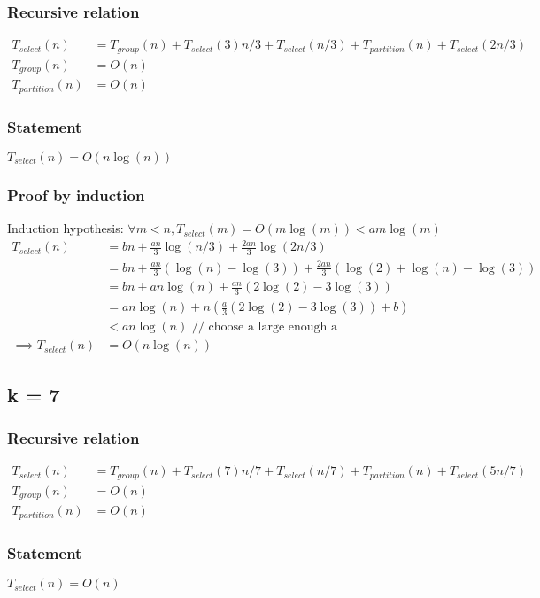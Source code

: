 \documentclass{article}
\begin{document}
\subsubsection{Recursive relation}
\begin{align*}
T_{select}(n) &= T_{group}(n) + T_{select}(3)n/3 + T_{select}(n/3)
+T_{partition}(n) + T_{select}(2n/3)\\
T_{group}(n) &= O(n)\\
T_{partition}(n) &= O(n)
\end{align*}
\subsubsection{Statement}
$T_{select}(n) = O(n \log (n))$
\subsubsection{Proof by induction}
Induction hypothesis: $\forall m < n, T_{select}(m) = O(m\log(m)) < am\log(m)$
\begin{align*}
T_{select}(n)
&= bn + \frac{an}{3}\log(n/3) + \frac{2an}{3}\log(2n/3)\\
&= bn + \frac{an}{3}(\log(n) - \log(3)) + \frac{2an}{3}(\log(2)+\log(n)-\log(3))\\
&= bn + an \log(n) + \frac{an}{3}(2\log(2)-3\log(3))\\
&= an \log(n) + n(\frac{a}{3}(2\log(2)-3\log(3)) + b)\\
&< an \log(n) \text{ // choose a large enough a}\\
\implies T_{select}(n) &= O(n \log(n))
\end{align*}
\subsection{k = 7}
\subsubsection{Recursive relation}
\begin{align*}
T_{select}(n) &= T_{group}(n) + T_{select}(7)n/7 + T_{select}(n/7)
+T_{partition}(n) + T_{select}(5n/7)\\
T_{group}(n) &= O(n)\\
T_{partition}(n) &= O(n)
\end{align*}
\subsubsection{Statement}
$T_{select}(n) = O(n)$
\end{document}
